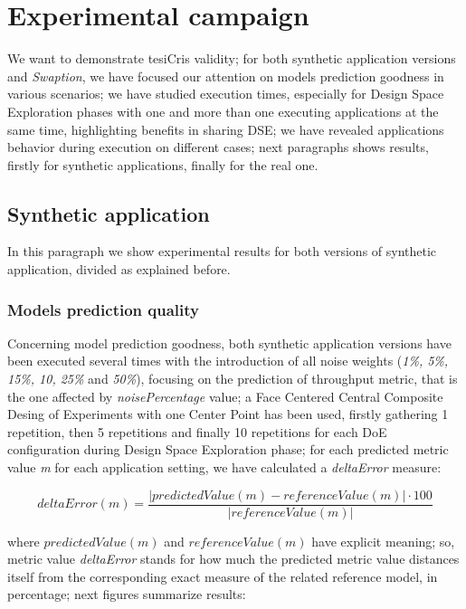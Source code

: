 \section{Experimental campaign}

We want to demonstrate tesiCris validity; for both synthetic application versions and \textit{Swaption}, we have focused our attention on models prediction goodness in various scenarios; we have studied execution times, especially for Design Space Exploration phases with one and more than one executing applications at the same time, highlighting benefits in sharing DSE; we have revealed applications behavior during execution on different cases; next paragraphs shows results, firstly for synthetic applications, finally for the real one.


\subsection{Synthetic application}

In this paragraph we show experimental results for both versions of synthetic application, divided as explained before.


\subsubsection{Models prediction quality}\label{deltaErrorExplanation}

Concerning model prediction goodness, both synthetic application versions have been executed several times with the introduction of all noise weights (\textit{1\%, 5\%, 15\%, 10, 25\%} and \textit{50\%}), focusing on the prediction of throughput metric, that is the one affected by \textit{noisePercentage} value; a Face Centered Central Composite Desing of Experiments with one Center Point has been used, firstly gathering 1 repetition, then 5 repetitions and finally 10 repetitions for each DoE configuration during Design Space Exploration phase; for each predicted metric value \textit{m} for each application setting, we have calculated a \textit{deltaError} measure:

\[
deltaError(m) = \dfrac{\left\vert predictedValue(m) - referenceValue(m) \right\vert \cdot 100}{\left\vert referenceValue(m) \right\vert}
\]

where $predictedValue(m)$ and $referenceValue(m)$ have explicit meaning; so, metric value \textit{deltaError} stands for how much the predicted metric value distances itself from the corresponding exact measure of the related reference model, in percentage; next figures summarize results:





